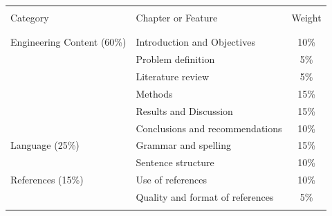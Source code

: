 \begin{center}%
	\begin{minipage}{\columnwidth}%
	\centering%
	\label{tbl:ModuleWeight}
	\begin{tabular}{llc}
		\hline \\
		Category					& Chapter or Feature				& Weight \\
		\\
		\hline \\
		Engineering Content (60\%)	& Introduction and Objectives		& 10\%   \\
									& Problem definition				& 5\%    \\
									& Literature review					& 5\%    \\
									& Methods							& 15\%   \\
									& Results and Discussion			& 15\%   \\
									& Conclusions and recommendations	& 10\%   \\
		Language (25\%)				& Grammar and spelling				& 15\%   \\
									& Sentence structure				& 10\%   \\
		References (15\%)			& Use of references					& 10\%   \\
									& Quality and format of references	& 5\%    \\
		\hline \\
	\end{tabular}
	\end{minipage}
\end{center}


